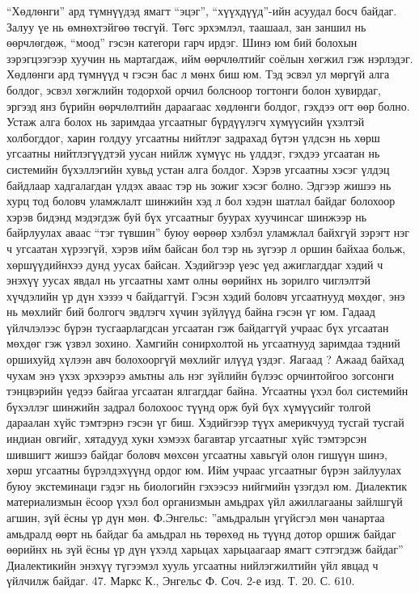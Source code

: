 “Хөдлөнги” ард түмнүүдэд ямагт “эцэг”, “хүүхдүүд”-ийн асуудал босч байдаг. Залуу үе нь өмнөхтэйгөө төсгүй. Төгс эрхэмлэл, таашаал, зан заншил нь өөрчлөгдөж, “моод” гэсэн категори гарч ирдэг. Шинэ юм бий болохын зэрэгцээгээр хуучин нь мартагдаж, ийм өөрчлөлтийг соёлын хөгжил гэж нэрлэдэг.
Хөдлөнги ард түмнүүд ч гэсэн бас л мөнх биш юм. Тэд эсвэл ул мөргүй алга болдог, эсвэл хөгжлийн тодорхой орчил болсноор тогтонги болон хувирдаг, эргээд янз бүрийн өөрчлөлтийн дараагаас хөдлөнги болдог, гэхдээ огт өөр болно. Устаж алга болох нь заримдаа угсаатныг бүрдүүлэгч хүмүүсийн үхэлтэй холбогддог, харин голдуу угсаатны нийтлэг задрахад бүтэн үлдсэн нь хөрш угсаатны нийтлэгүүдтэй уусан нийлж хүмүүс нь үлддэг, гэхдээ угсаатан нь системийн бүхэллэгийн хувьд устан алга болдог. Хэрэв угсаатны хэсэг үлдэц байдлаар хадгалагдан үлдэх аваас тэр нь зожиг хэсэг болно.
Эдгээр жишээ нь хурц тод боловч уламжлалт шинжийн хэд л бол хэдэн шатлал байдаг болохоор хэрэв бидэнд мэдэгдэж буй бүх угсаатныг буурах хуучинсаг шинжээр нь байрлуулах аваас “тэг түвшин” буюу өөрөөр хэлбэл уламжлал байхгүй зэрэгт нэг ч угсаатан хүрээгүй, хэрэв ийм байсан бол тэр нь зүгээр л оршин байхаа больж, хөршүүдийнхээ дунд уусах байсан. Хэдийгээр үеэс үед ажиглагддаг хэдий ч энэхүү уусах явдал нь угсаатны хамт олны өөрийнх нь зорилго чиглэлтэй хүчдэлийн үр дүн хэзээ ч байдаггүй. Гэсэн хэдий боловч угсаатнууд мөхдөг, энэ нь мөхлийг бий болгогч эвдлэгч хүчин зүйлүүд байна гэсэн үг юм. Гадаад үйлчлэлээс бүрэн тусгаарлагдсан угсаатан гэж байдаггүй учраас бүх угсаатан мөхдөг гэж үзвэл зохино. Хамгийн сонирхолтой нь угсаатнууд заримдаа тэдний оршихуйд хүлээн авч болохооргүй мөхлийг илүүд үздэг. Яагаад ?
Ажаад байхад чухам энэ үхэх эрхээрээ амьтны аль нэг зүйлийн бүлээс орчинтойгоо зогсонги тэнцвэрийн үедээ байгаа угсаатан ялгагддаг байна. Угсаатны үхэл бол системийн бүхэллэг шинжийн задрал болохоос түүнд орж буй бүх хүмүүсийг толгой дараалан хүйс тэмтэрнэ гэсэн үг биш. Хэдийгээр түүх америкчууд тусгай тусгай индиан овгийг, хятадууд хукн хэмээх багавтар угсаатныг хүйс тэмтэрсэн шившигт жишээ байдаг боловч мөхсөн угсаатны хавьгүй олон гишүүн шинэ, хөрш угсаатны бүрэлдэхүүнд ордог юм. Ийм учраас угсаатныг бүрэн зайлуулах буюу экстеминаци гэдэг нь биологийн гэхээсээ нийгмийн үзэгдэл юм.
Диалектик материализмын ёсоор үхэл бол организмын амьдрах үйл ажиллагааны зайлшгүй агшин, зүй ёсны үр дүн мөн. Ф.Энгельс: ”амьдралын үгүйсгэл мөн чанартаа амьдралд өөрт нь байдаг ба амьдрал нь төрөхөд нь түүнд дотор оршиж байдаг өөрийнх нь зүй ёсны үр дүн үхэлд харьцах харьцаагаар ямагт сэтгэгдэж байдаг” Диалектикийн энэхүү түгээмэл хууль угсаатны нийлэгжилтийн үйл явцад ч үйлчилж байдаг. 47. Маркс К., Энгельс Ф. Соч. 2-е изд. Т. 20. С. 610.
